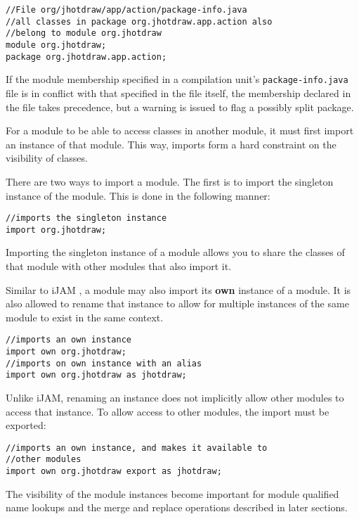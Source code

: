 \begin{lstlisting}
//File org/jhotdraw/app/action/package-info.java
//all classes in package org.jhotdraw.app.action also
//belong to module org.jhotdraw
module org.jhotdraw;
package org.jhotdraw.app.action;
\end{lstlisting}

If the module membership specified in a compilation unit's {\tt package-info.java}
file is in conflict with that specified in the file itself, the membership
declared in the file takes precedence, but a warning is issued to flag a possibly
split package.


For a module to be able to access classes in another module,
it must first import an instance of that module. This way, imports form
a hard constraint on the visibility of classes.

There are two ways to import a module. The first is to import the singleton
instance of the module. This is done in the following manner:

\begin{lstlisting}
//imports the singleton instance
import org.jhotdraw;
\end{lstlisting}

Importing the singleton instance of a module allows you to share the classes
of that module with other modules that also import it.

Similar to iJAM \cite{iJAM}, a module may also import its \textbf{own} instance of
a module. It is also allowed to rename that instance to allow for multiple
instances of the same module to exist in the same context.

\begin{lstlisting}
//imports an own instance
import own org.jhotdraw;
//imports on own instance with an alias
import own org.jhotdraw as jhotdraw;
\end{lstlisting}

Unlike iJAM, renaming an instance does not implicitly allow other
modules to access that instance. To allow access to other modules, the import
must be exported:

\begin{lstlisting}
//imports an own instance, and makes it available to
//other modules
import own org.jhotdraw export as jhotdraw;
\end{lstlisting}

The visibility of the module instances become important for module
qualified name lookups and the merge and replace operations described in later
sections.

